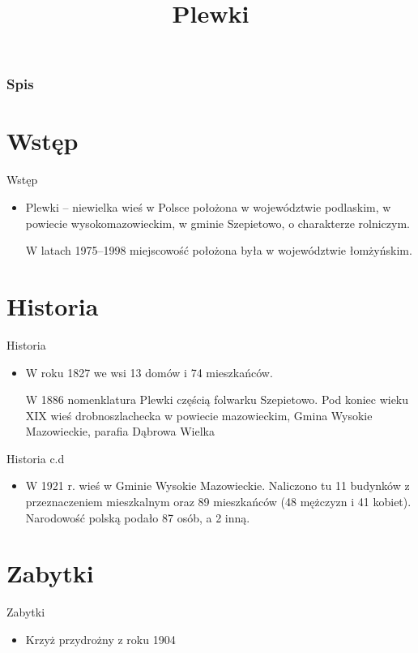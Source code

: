 \documentclass{beamer}
\title{Plewki}
\author{}
\begin{document}
\frame{\titlepage}

\begin {frame}
\frametitle{Spis}
\tableofcontents
\end {frame}


\section{Wstęp}
\begin{frame}{Wstęp}
\begin{itemize}
\item Plewki – niewielka wieś w Polsce położona w województwie podlaskim, w powiecie wysokomazowieckim, w gminie Szepietowo, o charakterze rolniczym.

W latach 1975–1998 miejscowość położona była w województwie łomżyńskim.

\end{itemize}
\end{frame}


\section{Historia}
\begin{frame}{Historia}
\begin {itemize}
\item W roku 1827 we wsi 13 domów i 74 mieszkańców.

W 1886 nomenklatura Plewki częścią folwarku Szepietowo. Pod koniec wieku XIX wieś drobnoszlachecka w powiecie mazowieckim, Gmina Wysokie Mazowieckie, parafia Dąbrowa Wielka


\end {itemize}
\end{frame}
\begin{frame}{Historia c.d}
\begin{itemize}
\item W 1921 r. wieś w Gminie Wysokie Mazowieckie. Naliczono tu 11 budynków z przeznaczeniem mieszkalnym oraz 89 mieszkańców (48 mężczyzn i 41 kobiet). Narodowość polską podało 87 osób, a 2 inną.
\end{itemize}
\end{frame}
\section {Zabytki}
\begin {frame}{Zabytki}
\begin{itemize}
\item Krzyż przydrożny z roku 1904
\end{itemize}
\end{frame}
\end{document}
